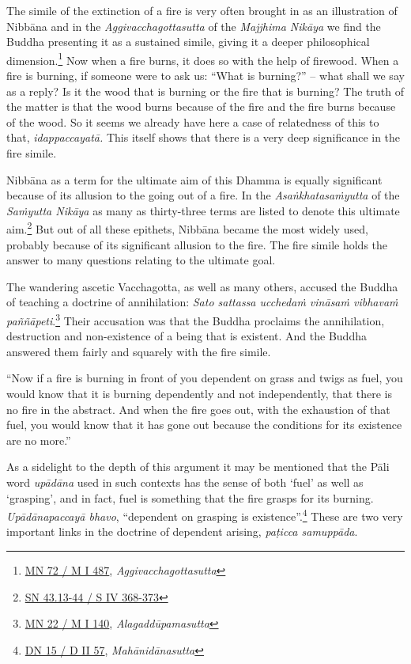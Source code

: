 The simile of the extinction of a fire is very often brought in as an illustration of Nibbāna and in the \emph{Aggivacchagottasutta} of the \emph{Majjhima Nikāya} we find the Buddha presenting it as a sustained simile, giving it a deeper philosophical dimension.\footnote{\href{https://suttacentral.net/mn72/pli/ms}{MN 72 / M I 487}, \emph{Aggivacchagottasutta}} Now when a fire burns, it does so with the help of firewood. When a fire is burning, if someone were to ask us: ``What is burning?'' -- what shall we say as a reply? Is it the wood that is burning or the fire that is burning? The truth of the matter is that the wood burns because of the fire and the fire burns because of the wood. So it seems we already have here a case of relatedness of this to that, \emph{idappaccayatā.} This itself shows that there is a very deep significance in the fire simile.

Nibbāna as a term for the ultimate aim of this Dhamma is equally significant because of its allusion to the going out of a fire. In the \emph{Asaṅkhatasaṁyutta} of the \emph{Saṁyutta Nikāya} as many as thirty-three terms are listed to denote this ultimate aim.\footnote{\href{https://suttacentral.net/sn43.13/pli/ms}{SN 43.13-44 / S IV 368-373}} But out of all these epithets, Nibbāna became the most widely used, probably because of its significant allusion to the fire. The fire simile holds the answer to many questions relating to the ultimate goal.

The wandering ascetic Vacchagotta, as well as many others, accused the Buddha of teaching a doctrine of annihilation: \emph{Sato sattassa ucchedaṁ vināsaṁ vibhavaṁ paññāpeti}.\footnote{\href{https://suttacentral.net/mn22/pli/ms}{MN 22 / M I 140}, \emph{Alagaddūpamasutta}} Their accusation was that the Buddha proclaims the annihilation, destruction and non-existence of a being that is existent. And the Buddha answered them fairly and squarely with the fire simile.

``Now if a fire is burning in front of you dependent on grass and twigs as fuel, you would know that it is burning dependently and not independently, that there is no fire in the abstract. And when the fire goes out, with the exhaustion of that fuel, you would know that it has gone out because the conditions for its existence are no more.''

As a sidelight to the depth of this argument it may be mentioned that the Pāli word \emph{upādāna} used in such contexts has the sense of both `fuel' as well as `grasping', and in fact, fuel is something that the fire grasps for its burning. \emph{Upādānapaccayā bhavo}, ``dependent on grasping is existence''.\footnote{\href{https://suttacentral.net/dn15/pli/ms}{DN 15 / D II 57}, \emph{Mahānidānasutta}} These are two very important links in the doctrine of dependent arising, \emph{paṭicca samuppāda}.

